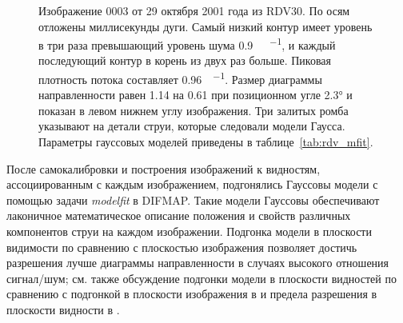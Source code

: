 \begin{figure}[]
 \caption{Изображение 0003 от 29 октября 2001 года из RDV30. По осям отложены
миллисекунды дуги. Самый низкий контур имеет уровень в три раза превышающий уровень шума
\SI{0.9}{\milli\jansky\per\beam}, и каждый последующий контур в корень из двух раз больше. Пиковая
плотность потока составляет \SI{0.96}{\jansky\per\beam}. Размер диаграммы направленности
равен 1.14 на \SI{0.61}{\mas} при позиционном угле \ang{2.3} и показан в
левом нижнем углу изображения. Три залитых ромба указывают на детали струи, которые следовали
модели Гаусса. Параметры гауссовых моделей приведены в таблице~\ref{tab:rdv_mfit}.}
 \label{fig:0003}
\end{figure}

После самокалибровки и построения изображений к видностям, ассоциированным с каждым изображением,
подгонялись Гауссовы модели с помощью задачи \emph{modelfit} в DIFMAP. Такие модели Гауссовы
обеспечивают лаконичное математическое описание положения и свойств различных компонентов
струи на каждом изображении. Подгонка модели в плоскости видимости по сравнению с плоскостью
изображения позволяет достичь разрешения лучше диаграммы направленности в случаях высокого
отношения сигнал/шум; см. также обсуждение подгонки модели в плоскости видностей по сравнению с
подгонкой в плоскости изображения в \cite{Lister_2009b} и предела разрешения в плоскости видности
в \cite{Kovalev_2005}.

